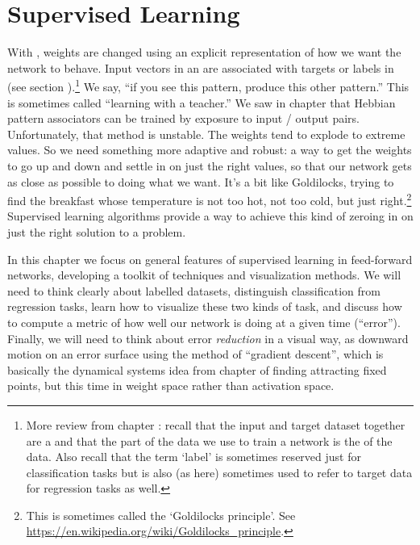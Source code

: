 \chapter{Supervised Learning}\label{ch_supervised}


With , weights are changed using an explicit representation of how we want the network to behave. Input vectors in an  are associated with targets or labels in  (see section ).\footnote{More review from chapter : recall that the input and target dataset together are a  and that the part of the data we use to train a network is the  of the data. Also recall that the term `label' is sometimes reserved just for classification tasks but is also (as here) sometimes used to refer to target data for regression tasks as well.}  We say, ``if you see this pattern, produce this other pattern.''  This is sometimes called ``learning with a teacher.'' We saw in chapter  that Hebbian pattern associators can be trained by exposure to input / output pairs. Unfortunately, that method is unstable. The weights tend to explode to extreme values. So we need something more adaptive and robust: a way to get the weights to go up and down and settle in on just the right values, so that our network gets as close as possible to doing what we want. It's a bit like Goldilocks, trying to find the breakfast whose temperature is not too hot, not too cold, but just right.\footnote{This is sometimes called the `Goldilocks principle'. See \url{https://en.wikipedia.org/wiki/Goldilocks_principle}.} Supervised learning algorithms provide a way to achieve this kind of zeroing in on just the right solution to a problem.

In this chapter we focus on general features of supervised learning in feed-forward networks, developing a toolkit of  techniques and visualization methods. We will need to think clearly about labelled datasets, distinguish classification from regression tasks, learn how to visualize these two kinds of task, and discuss how to compute a metric of how well our network is doing at a given time (``error''). Finally, we will need to think about error \emph{reduction} in a visual way, as downward motion on an error surface using the method of ``gradient descent'', which is basically the dynamical systems idea from chapter  of finding attracting fixed points, but this time in weight space rather than activation space. 

